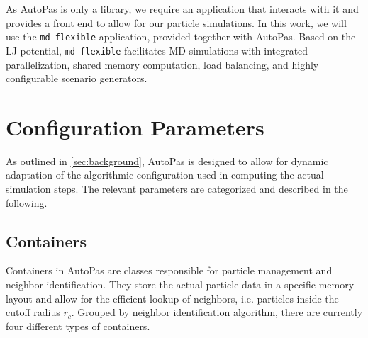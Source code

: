 
As AutoPas is only a library, we require an application that interacts with it and provides a front end to allow for our particle simulations. In this work, we will use the \texttt{md-flexible} application, provided together with AutoPas. Based on the LJ potential, \texttt{md-flexible} facilitates MD simulations with integrated parallelization, shared memory computation, load balancing, and highly configurable scenario generators.



\section{Configuration Parameters}
\label{sec:config_params}

As outlined in \autoref{sec:background}, AutoPas is designed to allow for dynamic adaptation of the algorithmic configuration used in computing the actual simulation steps. The relevant parameters are categorized and described in the following.

\subsection{Containers}

Containers in AutoPas are classes responsible for particle management and neighbor identification. They store the actual particle data in a specific memory layout and allow for the efficient lookup of neighbors, i.e. particles inside the cutoff radius $r_c$. Grouped by neighbor identification algorithm, there are currently four different types of containers.

